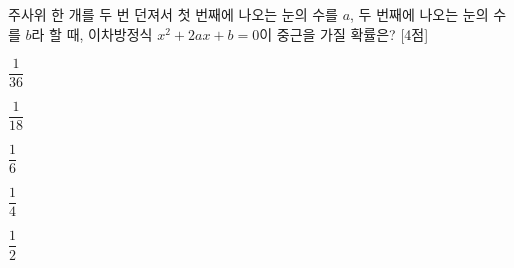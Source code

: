주사위 한 개를 두 번 던져서 첫 번째에 나오는 눈의 수를 $a$, 두 번째에 나오는 눈의 수를 $b$라 할 때, 이차방정식 $x^2+2ax+b=0$이 중근을 가질 확률은? \mbox{[4점]}
\begin{choices32}{\rule[-3ex]{0pt}{8ex}$\dfrac{1}{36}$}{\rule[-3ex]{0pt}{8ex}$\dfrac{1}{18}$}{\rule[-3ex]{0pt}{8ex}$\dfrac{1}{6}$}{\rule[-3ex]{0pt}{8ex}$\dfrac{1}{4}$}{\rule[-3ex]{0pt}{8ex}$\dfrac{1}{2}$}\end{choices32}

